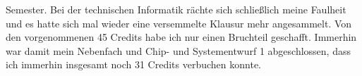 \begin{multicols}{2}
Semester. Bei der technischen Informatik rächte sich schließlich meine
Faulheit und es hatte sich mal wieder eine versemmelte Klausur mehr angesammelt.
Von den vorgenommenen 45 Credits habe ich nur einen Bruchteil geschafft.
Immerhin war damit mein Nebenfach und Chip- und Systementwurf 1
abgeschlossen, dass ich immerhin insgesamt noch 31 Credits verbuchen
konnte.


\end{multicols}
